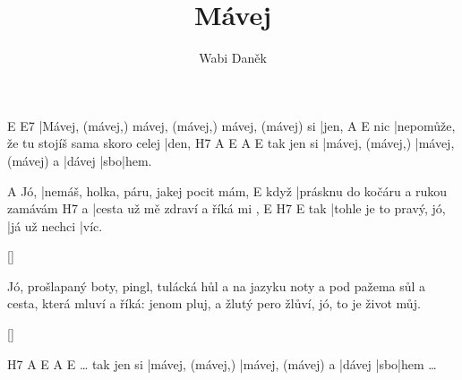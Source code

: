 \documentclass{song}
\title{Mávej}
\author{Wabi Daněk}
\begin{document}
E                                                  E7
|Mávej, (mávej,) mávej, (mávej,) mávej, (mávej) si |jen,
    A                                        E
nic |nepomůže, že tu stojíš sama skoro celej |den,
           H7               A                 E      A   E
tak jen si |mávej, (mávej,) |mávej, (mávej) a |dávej |sbo|hem.
\endstrophe

\strophe
    A
Jó, |nemáš, holka, páru, jakej pocit mám,
     E
když |prásknu do kočáru a rukou zamávám
  H7
a |cesta už mě zdraví a říká mi ,
    E                       H7            E
tak |tohle je to pravý, jó, |já už nechci |víc.
\endstrophe

\ref{}

\strophe*
Jó, prošlapaný boty, pingl, tulácká hůl
a na jazyku noty a pod pažema sůl
a cesta, která mluví a říká: jenom pluj,
a žlutý pero žlůví, jó, to je život můj.
\endstrophe

\ref{}

\strophe
                    H7               A                 E      A   E
\ldots{} tak jen si |mávej, (mávej,) |mávej, (mávej) a |dávej |sbo|hem \ldots
\endstrophe
\end{document}
